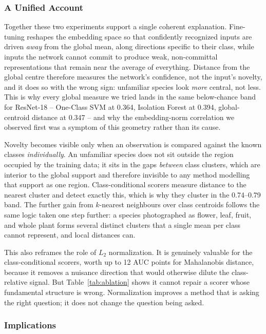 \documentclass[11pt]{article}
\begin{document}
\subsubsection{A Unified Account}

Together these two experiments support a single coherent explanation. Fine-tuning reshapes the embedding space so that confidently recognized inputs are driven \emph{away} from the global mean, along directions specific to their class, while inputs the network cannot commit to produce weak, non-committal representations that remain near the average of everything. Distance from the global centre therefore measures the network's confidence, not the input's novelty, and it does so with the wrong sign: unfamiliar species look \emph{more} central, not less. This is why every global measure we tried lands in the same below-chance band for ResNet-18 -- One-Class SVM at 0.364, Isolation Forest at 0.394, global-centroid distance at 0.347 -- and why the embedding-norm correlation we observed first was a symptom of this geometry rather than its cause.

Novelty becomes visible only when an observation is compared against the known classes \emph{individually}. An unfamiliar species does not sit outside the region occupied by the training data; it sits in the gaps \emph{between} class clusters, which are interior to the global support and therefore invisible to any method modelling that support as one region. Class-conditional scorers measure distance to the nearest cluster and detect exactly this, which is why they cluster in the 0.74--0.79 band. The further gain from $k$-nearest neighbours over class centroids follows the same logic taken one step further: a species photographed as flower, leaf, fruit, and whole plant forms several distinct clusters that a single mean per class cannot represent, and local distances can.

This also reframes the role of $L_2$ normalization. It is genuinely valuable for the class-conditional scorers, worth up to 12 AUC points for Mahalanobis distance, because it removes a nuisance direction that would otherwise dilute the class-relative signal. But Table~\ref{tab:ablation} shows it cannot repair a scorer whose fundamental structure is wrong. Normalization improves a method that is asking the right question; it does not change the question being asked.

\subsubsection{Implications}
\end{document}
